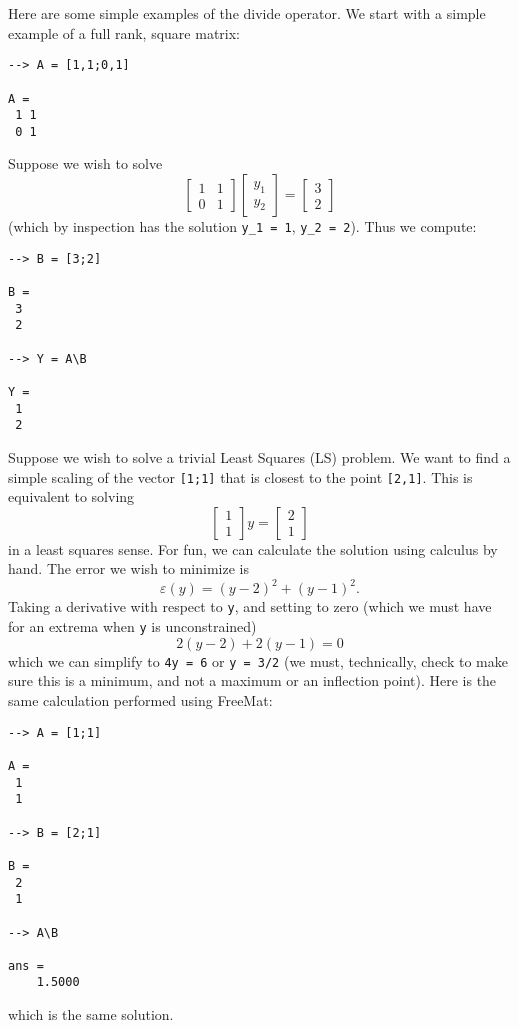 Here are some simple examples of the divide operator.  We start with a simple example of a full rank, square matrix:
\begin{verbatim}
--> A = [1,1;0,1]

A = 
 1 1 
 0 1 
\end{verbatim}
Suppose we wish to solve
\[
  \begin{bmatrix} 1 & 1 \\ 0 & 1 \end{bmatrix}
  \begin{bmatrix} y_1 \\ y_2 \end{bmatrix}
 = 
  \begin{bmatrix} 3 \\ 2 \end{bmatrix}
\]
(which by inspection has the solution \verb|y_1 = 1|, \verb|y_2 = 2|).  Thus we compute:
\begin{verbatim}
--> B = [3;2]

B = 
 3 
 2 

--> Y = A\B

Y = 
 1 
 2 
\end{verbatim}

Suppose we wish to solve a trivial Least Squares (LS) problem.  We want to find a simple scaling of the vector \verb|[1;1]| that is closest to the point \verb|[2,1]|.  This is equivalent to solving
\[
\begin{bmatrix} 1 \\ 1 \end{bmatrix} y = \begin{bmatrix} 2 \\ 1 \end{bmatrix}
\]
in a least squares sense.  For fun, we can calculate the solution using calculus by hand.  The error we wish to minimize is
\[
  \varepsilon(y) = (y - 2)^2 + (y-1)^2.
\]
Taking a derivative with respect to \verb|y|, and setting to zero (which we must have for an extrema when \verb|y| is unconstrained)
\[
  2 (y-2) + 2 (y-1) = 0
\]
which we can simplify to \verb|4y = 6| or \verb|y = 3/2| (we must, technically, check to make sure this is a minimum, and not a maximum or an inflection point).  Here is the same calculation performed using FreeMat:
\begin{verbatim}
--> A = [1;1]

A = 
 1 
 1 

--> B = [2;1]

B = 
 2 
 1 

--> A\B

ans = 
    1.5000 
\end{verbatim}
which is the same solution.
